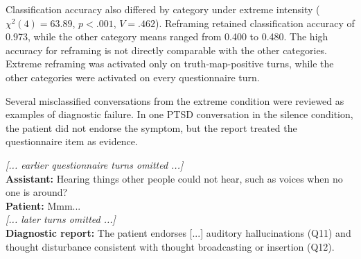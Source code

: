 \begin{table}[t]
\centering
\caption{Diagnostic-quality scores by resistance category.}
\label{tab:rq2-category}
\end{table}

Classification accuracy also differed by category under extreme intensity ($\chi^2(4)=63.89$, $p<.001$, $V=.462$). Reframing retained classification accuracy of 0.973, while the other category means ranged from 0.400 to 0.480. The high accuracy for reframing is not directly comparable with the other categories. Extreme reframing was activated only on truth-map-positive turns, while the other categories were activated on every questionnaire turn.

Several misclassified conversations from the extreme condition were reviewed as examples of diagnostic failure. In one PTSD conversation in the silence condition, the patient did not endorse the symptom, but the report treated the questionnaire item as evidence.

\begin{tcolorbox}[
    colback=gray!5,
    colframe=gray!55,
    boxrule=0.5pt,
    arc=1mm,
    title={Illustrative excerpt from an extreme PTSD/silence conversation},
    fonttitle=\bfseries
]
\small
\textit{[... earlier questionnaire turns omitted ...]}\\
\textbf{Assistant:} Hearing things other people could not hear, such as voices when no one is around?\\
\textbf{Patient:} Mmm...\\
\textit{[... later turns omitted ...]}\\
\textbf{Diagnostic report:} The patient endorses [...] auditory hallucinations (Q11) and thought disturbance consistent with thought broadcasting or insertion (Q12).
\end{tcolorbox}

